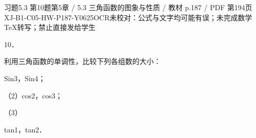 \begin{bankitem}{习题5.3 第10题}{第5章 / 5.3 三角函数的图象与性质 / 教材 p.187 / PDF 第194页}{XJ-B1-C05-HW-P187-Y0625}{OCR未校对：公式与文字均可能有误；未完成数学TeX转写；禁止直接发给学生}
\begin{ocrdraft}
\par
10．
\par
利用三角函数的单调性，比较下列各组数的大小：
\par
Sin3，Sin4；
\par
（2）cos2，cos3；
\par
（3）
\par
tan1，tan2．
\end{ocrdraft}
\end{bankitem}
